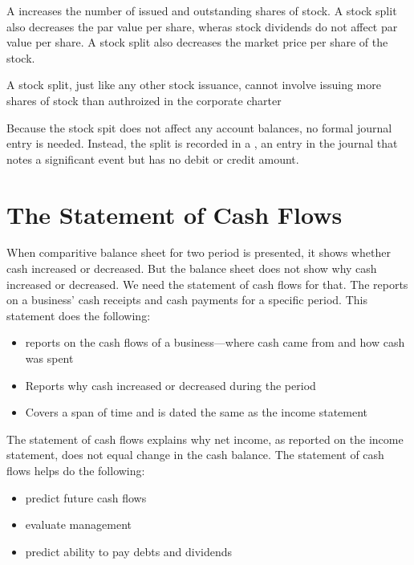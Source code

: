\documentclass{article}
\begin{document}
A  increases the number of issued and outstanding shares of stock. A stock split also decreases the par value per share, wheras stock dividends do not affect par value per share. A stock split also decreases the market price per share of the stock. 
\begin{remark}
  A stock split, just like any other stock issuance, cannot involve issuing more shares of stock than authroized in the corporate charter
\end{remark}
Because the stock spit does not affect any account balances, no formal journal entry is needed. Instead, the split is recorded in a , an entry in the journal that notes a significant event but has no debit or credit amount.

\section{The Statement of Cash Flows}

When comparitive balance sheet for two period is presented, it shows whether cash increased or decreased. But the balance sheet does not show why cash increased or decreased. We need the statement of cash flows for that. The  reports on a business' cash receipts and cash payments for a specific period. This statement does the following:
\begin{itemize}
  \item reports on the cash flows of a business---where cash came from and how cash was spent 
  \item Reports why cash increased or decreased during the period 
  \item Covers a span of time and is dated the same as the income statement
\end{itemize}

The statement of cash flows explains why net income, as reported on the income statement, does not equal change in the cash balance. The statement of cash flows helps do the following: 
\begin{itemize}
  \item predict future cash flows 
  \item evaluate management 
  \item predict ability to pay debts and dividends
\end{itemize}
\end{document}
